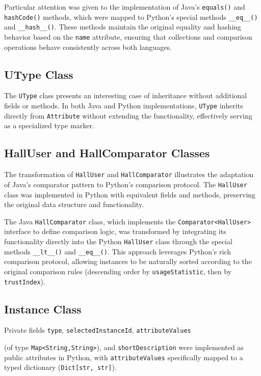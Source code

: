 \documentclass[12pt,a4paper]{article}
\begin{document}
Particular attention was given to the implementation of Java's \texttt{equals()} and \texttt{hashCode()} methods, which were mapped to Python's special methods \texttt{\_\_eq\_\_()} and \texttt{\_\_hash\_\_()}. These methods maintain the original equality and hashing behavior based on the \texttt{name} attribute, ensuring that collections and comparison operations behave consistently across both languages.

\subsection{UType Class}
The \texttt{UType} class presents an interesting case of inheritance without additional fields or methods. In both Java and Python implementations, \texttt{UType} inherits directly from \texttt{Attribute} without extending the functionality, effectively serving as a specialized type marker.


\subsection{HallUser and HallComparator Classes}
The transformation of \texttt{HallUser} and \texttt{HallComparator} illustrates the adaptation of Java's comparator pattern to Python's comparison protocol. The \texttt{HallUser} class was implemented in Python with equivalent fields and methods, preserving the original data structure and functionality.

The Java \texttt{HallComparator} class, which implements the \texttt{Comparator<HallUser>} interface to define comparison logic, was transformed by integrating its functionality directly into the Python \texttt{HallUser} class through the special methods \texttt{\_\_lt\_\_()} and \texttt{\_\_eq\_\_()}. This approach leverages Python's rich comparison protocol, allowing instances to be naturally sorted according to the original comparison rules (descending order by \texttt{usageStatistic}, then by \texttt{trustIndex}).


\subsection{Instance Class}
Private fields \texttt{type}, \texttt{selectedInstanceId}, \texttt{attributeValues}

\noindent(of type \texttt{Map<String,String>}), and \texttt{shortDescription} were implemented as public attributes in Python, with \texttt{attributeValues} specifically mapped to a typed dictionary (\texttt{Dict[str, str]}).
\end{document}
